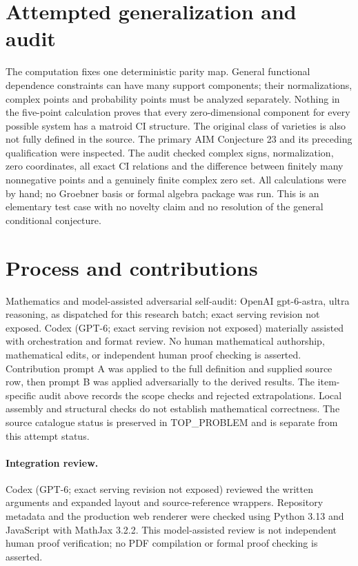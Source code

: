 \documentclass[11pt]{article}
\begin{document}
\section{Attempted generalization and audit}
The computation fixes one deterministic parity map. General functional
dependence constraints can have many support components; their
normalizations, complex points and probability points must be analyzed
separately. Nothing in the five-point calculation proves that every
zero-dimensional component for every possible system has a matroid CI
structure. The original class of varieties is also not fully defined in
the source. The primary AIM Conjecture 23 and its preceding qualification
were inspected. The audit checked complex signs, normalization, zero
coordinates, all exact CI relations and the difference between finitely
many nonnegative points and a genuinely finite complex zero set. All
calculations were by hand; no Groebner basis or formal algebra package
was run. This is an elementary test case with no novelty claim and no
resolution of the general conditional conjecture.

\section{Process and contributions}
Mathematics and model-assisted adversarial self-audit: OpenAI gpt-6-astra, ultra reasoning, as dispatched for this research batch; exact serving revision not exposed. Codex (GPT-6; exact serving revision not exposed) materially assisted with orchestration and format review. No human mathematical authorship, mathematical edits, or independent human proof checking is asserted.
Contribution prompt A was applied to the full definition and supplied source row, then prompt B was applied adversarially to the derived results. The item-specific audit above records the scope checks and rejected extrapolations. Local assembly and structural checks do not establish mathematical correctness. The source catalogue status is preserved in TOP\_PROBLEM and is separate from this attempt status.
\paragraph{Integration review.} Codex (GPT-6; exact serving revision not exposed) reviewed the written arguments and expanded layout and source-reference wrappers. Repository metadata and the production web renderer were checked using Python 3.13 and JavaScript with MathJax 3.2.2. This model-assisted review is not independent human proof verification; no PDF compilation or formal proof checking is asserted.
\end{document}
